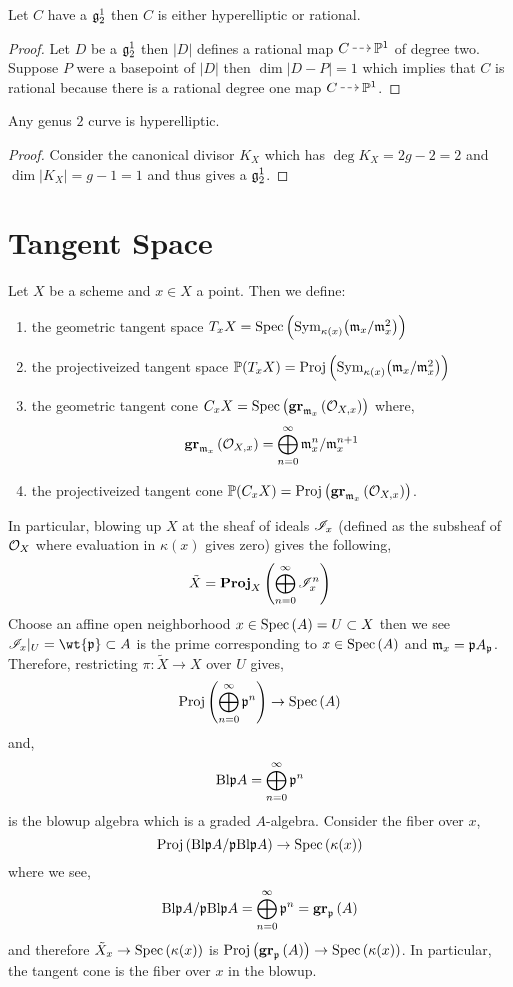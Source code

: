 \documentclass[12pt]{article}
\begin{document}
\begin{lemma}
Let $C$ have a $\mathfrak{g}^{1}_{2}$ then $C$ is either hyperelliptic or rational.
\end{lemma}

\begin{proof}
Let $D$ be a $\mathfrak{g}^{1}_{2}$ then $|D|$ defines a rational map $C \rat \P^1$ of degree two. Suppose $P$ were a basepoint of $|D|$ then $\dim |D - P| = 1$ which implies that $C$ is rational because there is a rational degree one map $C \rat \P^1$. 
\end{proof}

\begin{prop}
Any genus $2$ curve is hyperelliptic. 
\end{prop}

\begin{proof}
Consider the canonical divisor $K_X$ which has $\deg{K_X} = 2g - 2 = 2$ and $\dim{|K_X|} = g - 1 = 1$ and thus gives a $\mathfrak{g}^{1}_{2}$. 
\end{proof}

\section{Tangent Space}


\begin{defn}
Let $X$ be a scheme and $x \in X$ a point. Then we define:
\begin{enumerate}
\item the geometric tangent space $T_x X = \mathrm{Spec}\left( \mathrm{Sym}_{\kappa(x)}\! \left( \mathfrak{m}_x / \mathfrak{m}_x^2 \right) \right)$
\item the projectiveized tangent space $\mathbb{P}(T_x X) = \mathrm{Proj}\left( \mathrm{Sym}_{\kappa(x)}\! \left( \mathfrak{m}_x / \mathfrak{m}_x^2 \right) \right)$
\item the geometric tangent cone $C_x X = \mathrm{Spec}\left( \mathbf{gr}_{\mathfrak{m}_x}\left(\mathcal{O}_{X, x}\right) \right)$ where,
\[ \mathbf{gr}_{\mathfrak{m}_x}\left(\mathcal{O}_{X, x}\right) = \bigoplus_{n = 0}^\infty \mathfrak{m}_x^n / \mathfrak{m}_x^{n+1} \]
\item the projectiveized tangent cone $\mathbb{P}(C_x X) = \mathrm{Proj}\left( \mathbf{gr}_{\mathfrak{m}_x}\left(\mathcal{O}_{X, x}\right) \right)$.
\end{enumerate}
\end{defn}

\begin{rmk}
In particular, blowing up $X$ at the sheaf of ideals $\mathscr{I}_x$ (defined as the subsheaf of $\mathcal{O}_{X}$ where evaluation in $\kappa(x)$ gives zero) gives the following,
\[ \tilde{X} =  \mathbf{Proj}_{X}\left( \bigoplus_{n = 0}^\infty \mathscr{I}_x^n \right) \]
Choose an affine open neighborhood $x \in \mathrm{Spec}\left( A \right) = U \subset X$ then we see $\I_x |_U = \wt{\p} \subset A$ is the prime corresponding to $x \in \mathrm{Spec}\left( A \right)$ and $\mathfrak{m}_x = \mathfrak{p} A_{\mathfrak{p}}$. Therefore, restricting $\pi : \tilde{X} \to X$ over $U$ gives,
\[ \mathrm{Proj}\left( \bigoplus_{n = 0}^\infty \mathfrak{p}^n \right) \to \mathrm{Spec}\left( A \right) \]
and,
\[ \mathrm{Bl}{\mathfrak{p}}{A} = \bigoplus_{n = 0}^\infty \mathfrak{p}^n \]
is the blowup algebra which is a graded $A$-algebra. Consider the fiber over $x$,
\[ \mathrm{Proj}\left( \mathrm{Bl}{\mathfrak{p}}{A} / \mathfrak{p} \mathrm{Bl}{\mathfrak{p}}{A} \right) \to \mathrm{Spec}\left( \kappa(x) \right) \]
where we see,
\[ \mathrm{Bl}{\mathfrak{p}}{A} / \mathfrak{p} \mathrm{Bl}{\mathfrak{p}}{A} = \bigoplus_{n = 0}^\infty \mathfrak{p}^n = \mathbf{gr}_{\mathfrak{p}}\left(A\right) \]
and therefore $\tilde{X}_x \to \mathrm{Spec}\left( \kappa(x) \right)$ is $\mathrm{Proj}\left( \mathbf{gr}_{\mathfrak{p}}\left(A\right) \right) \to \mathrm{Spec}\left( \kappa(x) \right)$.
In particular, the tangent cone is the fiber over $x$ in the blowup. 
\end{rmk}
\end{document}
